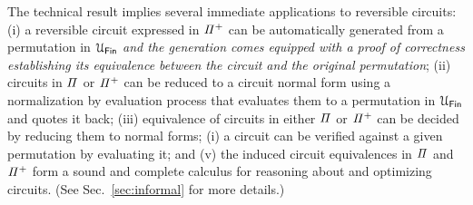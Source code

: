 The technical result implies several immediate applications to reversible circuits: (i) a reversible circuit expressed
in $\mathit{{\Pi}^{+}}$ can be automatically generated from a permutation in $\UFin$ \emph{and the generation comes equipped
  with a proof of correctness establishing its equivalence between the circuit and the original permutation}; (ii)
circuits in $\mathit{\Pi}$ or $\mathit{{\Pi}^{+}}$ can be reduced to a circuit normal form using a normalization by evaluation
process that evaluates them to a permutation in $\UFin$ and quotes it back; (iii) equivalence of circuits in either
$\mathit{\Pi}$ or $\mathit{{\Pi}^{+}}$ can be decided by reducing them to normal forms; (i) a circuit can be verified against a
given permutation by evaluating it; and (v) the induced circuit equivalences in $\mathit{\Pi}$ and $\mathit{{\Pi}^{+}}$ form a sound
and complete calculus for reasoning about and optimizing circuits. (See Sec.~\ref{sec:informal} for more details.)


